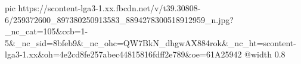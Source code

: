  
 
 
 
 

\ifcmt
  pic https://scontent-lga3-1.xx.fbcdn.net/v/t39.30808-6/259372600_897380250913583_8894278300518912959_n.jpg?_nc_cat=105&ccb=1-5&_nc_sid=8bfeb9&_nc_ohc=QW7BkN_dhgwAX884rok&_nc_ht=scontent-lga3-1.xx&oh=4e2cd8fe257abec44815816fdff2e789&oe=61A25942
  @width 0.8
\fi

